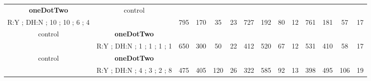 \begin{table}[H]
{\begin{tabular}{|c|c|c|c|c|c|c|c|c|c|c|c|c|c|}
\cellcolor{blue!15}\textbf{oneDotTwo} & control& {\color[HTML]{00009B} } & {\color[HTML]{9A0000} } & {\color[HTML]{009901} } &  & {\color[HTML]{00009B} } & {\color[HTML]{9A0000} } & {\color[HTML]{009901} } &  & {\color[HTML]{00009B} } & {\color[HTML]{9A0000} } & {\color[HTML]{009901} } &  \\ 
\cellcolor{ blue!15}R:Y ; DH:N ; 10 ; 10 ; 6 ; 4 &  & \multirow{-2}{*}{{\color[HTML]{00009B} 795}} & \multirow{-2}{*}{{\color[HTML]{9A0000} 170}} & \multirow{-2}{*}{{\color[HTML]{009901} 35}} & \multirow{-2}{*}{23} & \multirow{-2}{*}{{\color[HTML]{00009B} 727}} & \multirow{-2}{*}{{\color[HTML]{9A0000} 192}} & \multirow{-2}{*}{{\color[HTML]{009901} 80}} & \multirow{-2}{*}{12} & \multirow{-2}{*}{{\color[HTML]{00009B} 761}} & \multirow{-2}{*}{{\color[HTML]{9A0000} 181}} & \multirow{-2}{*}{{\color[HTML]{009901} 57}} & \multirow{-2}{*}{17} \\ \hline

control & \cellcolor{blue!15}\textbf{oneDotTwo}& {\color[HTML]{00009B} } & {\color[HTML]{9A0000} } & {\color[HTML]{009901} } &  & {\color[HTML]{00009B} } & {\color[HTML]{9A0000} } & {\color[HTML]{009901} } &  & {\color[HTML]{00009B} } & {\color[HTML]{9A0000} } & {\color[HTML]{009901} } &  \\ 
 & \cellcolor{ blue!15}R:Y ; DH:N ; 1 ; 1 ; 1 ; 1 & \multirow{-2}{*}{{\color[HTML]{00009B} 650}} & \multirow{-2}{*}{{\color[HTML]{9A0000} 300}} & \multirow{-2}{*}{{\color[HTML]{009901} 50}} & \multirow{-2}{*}{22} & \multirow{-2}{*}{{\color[HTML]{00009B} 412}} & \multirow{-2}{*}{{\color[HTML]{9A0000} 520}} & \multirow{-2}{*}{{\color[HTML]{009901} 67}} & \multirow{-2}{*}{12} & \multirow{-2}{*}{{\color[HTML]{00009B} 531}} & \multirow{-2}{*}{{\color[HTML]{9A0000} 410}} & \multirow{-2}{*}{{\color[HTML]{009901} 58}} & \multirow{-2}{*}{17} \\ \hline

control & \cellcolor{blue!15}\textbf{oneDotTwo}& {\color[HTML]{00009B} } & {\color[HTML]{9A0000} } & {\color[HTML]{009901} } &  & {\color[HTML]{00009B} } & {\color[HTML]{9A0000} } & {\color[HTML]{009901} } &  & {\color[HTML]{00009B} } & {\color[HTML]{9A0000} } & {\color[HTML]{009901} } &  \\ 
 & \cellcolor{ blue!15}R:Y ; DH:N ; 4 ; 3 ; 2 ; 8 & \multirow{-2}{*}{{\color[HTML]{00009B} 475}} & \multirow{-2}{*}{{\color[HTML]{9A0000} 405}} & \multirow{-2}{*}{{\color[HTML]{009901} 120}} & \multirow{-2}{*}{26} & \multirow{-2}{*}{{\color[HTML]{00009B} 322}} & \multirow{-2}{*}{{\color[HTML]{9A0000} 585}} & \multirow{-2}{*}{{\color[HTML]{009901} 92}} & \multirow{-2}{*}{13} & \multirow{-2}{*}{{\color[HTML]{00009B} 398}} & \multirow{-2}{*}{{\color[HTML]{9A0000} 495}} & \multirow{-2}{*}{{\color[HTML]{009901} 106}} & \multirow{-2}{*}{19} \\ \hline


\end{tabular}}
\end{table}
